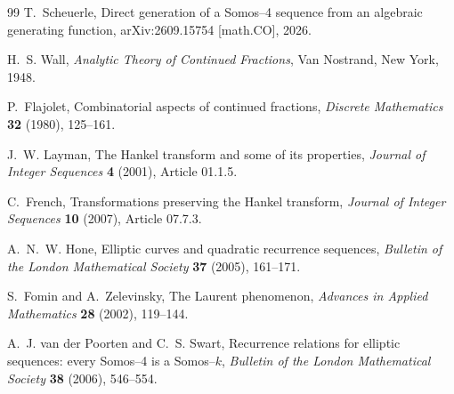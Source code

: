 \documentclass[11pt]{article}
\theoremstyle{definition}
\theoremstyle{remark}
\begin{document}
\begin{thebibliography}{99}
T.~Scheuerle,
\newblock Direct generation of a Somos--4 sequence from an algebraic generating function,
\newblock arXiv:2609.15754 [math.CO], 2026.

H.~S. Wall,
\newblock \emph{Analytic Theory of Continued Fractions},
\newblock Van Nostrand, New York, 1948.

P.~Flajolet,
\newblock Combinatorial aspects of continued fractions,
\newblock \emph{Discrete Mathematics} \textbf{32} (1980), 125--161.

J.~W. Layman,
\newblock The Hankel transform and some of its properties,
\newblock \emph{Journal of Integer Sequences} \textbf{4} (2001), Article 01.1.5.

C.~French,
\newblock Transformations preserving the Hankel transform,
\newblock \emph{Journal of Integer Sequences} \textbf{10} (2007), Article 07.7.3.

A.~N.~W. Hone,
\newblock Elliptic curves and quadratic recurrence sequences,
\newblock \emph{Bulletin of the London Mathematical Society} \textbf{37} (2005), 161--171.

S.~Fomin and A.~Zelevinsky,
\newblock The Laurent phenomenon,
\newblock \emph{Advances in Applied Mathematics} \textbf{28} (2002), 119--144.

A.~J. van der Poorten and C.~S. Swart,
\newblock Recurrence relations for elliptic sequences: every Somos--4 is a Somos--$k$,
\newblock \emph{Bulletin of the London Mathematical Society} \textbf{38} (2006), 546--554.
\end{thebibliography}
\end{document}
